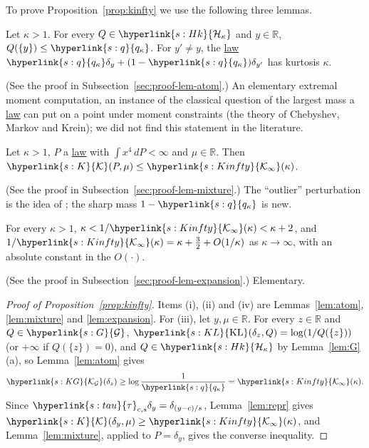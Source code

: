 \documentclass[11pt]{article}
\newcommand{\R}{\mathbb{R}}
\newcommand{\sy}[2]{{\hyperlink{#1}{#2}}}
\newcommand{\term}[2]{\hyperlink{#1}{#2}}
\newcommand{\KL}{\sy{s:KL}{\mathrm{KL}}}
\newcommand{\Hk}{\sy{s:Hk}{\mathcal{H}_{\kappa}}}
\newcommand{\Kc}{\sy{s:K}{\mathcal{K}}}
\newcommand{\Gk}{\sy{s:G}{\mathcal{G}}}
\newcommand{\KG}{\sy{s:KG}{\mathcal{K}_{\mathcal{G}}}}
\newcommand{\tauc}{\sy{s:tau}{\tau}}
\newcommand{\qk}{\sy{s:q}{q_{\kappa}}}
\newcommand{\Kinfty}{\sy{s:Kinfty}{\mathcal{K}_{\infty}}}
\begin{document}
To prove Proposition~\ref{prop:kinfty} we use the following three lemmas.

\begin{lemma}\label{lem:atom}
Let $\kappa>1$. For every $Q\in\Hk$ and $y\in\R$, $Q(\{y\})\le\qk$. For $y'\neq y$, the \term{w:law}{law}
$\qk\delta_y+(1-\qk)\delta_{y'}$ has kurtosis $\kappa$.
\end{lemma}

(See the proof in Subsection~\ref{sec:proof-lem-atom}.) An elementary extremal moment computation, an instance of
the classical question of the largest mass a \term{w:law}{law} can put on a point under moment constraints (the theory of
Chebyshev, Markov and Krein); we did not find this statement in the literature.

\begin{lemma}\label{lem:mixture}
Let $\kappa>1$, $P$ a \term{w:law}{law} with $\int x^4\,dP<\infty$ and $\mu\in\R$. Then $\Kc(P,\mu)\le\Kinfty(\kappa)$.
\end{lemma}

(See the proof in Subsection~\ref{sec:proof-lem-mixture}.) The ``outlier'' perturbation is the idea of
\citet[Appendix~A]{L17}; the sharp mass $1-\qk$ is new.

\begin{lemma}\label{lem:expansion}
For every $\kappa>1$, $\kappa<1/\Kinfty(\kappa)<\kappa+2$, and $1/\Kinfty(\kappa)=\kappa+\frac32+O(1/\kappa)$ as $\kappa\to\infty$, with an
absolute constant in the $O(\cdot)$.
\end{lemma}

(See the proof in Subsection~\ref{sec:proof-lem-expansion}.) Elementary.

\begin{proof}[Proof of Proposition~\ref{prop:kinfty}]
Items (i), (ii) and (iv) are Lemmas~\ref{lem:atom}, \ref{lem:mixture} and \ref{lem:expansion}. For (iii), let
$y,\mu\in\R$. For every $z\in\R$ and $Q\in\Gk$, $\KL(\delta_z,Q)=\log(1/Q(\{z\}))$ (or $+\infty$ if $Q(\{z\})=0$), and
$Q\in\Hk$ by Lemma~\ref{lem:G}(a), so Lemma~\ref{lem:atom} gives
\begin{equation*}
  \KG(\delta_z)\ge\log\frac1{\qk}=\Kinfty(\kappa).
\end{equation*}
Since $\tauc_{c,s}\delta_y=\delta_{(y-c)/s}$, Lemma~\ref{lem:repr} gives $\Kc(\delta_y,\mu)\ge\Kinfty(\kappa)$, and
Lemma~\ref{lem:mixture}, applied to $P=\delta_y$, gives the converse inequality.
\end{proof}
\end{document}
